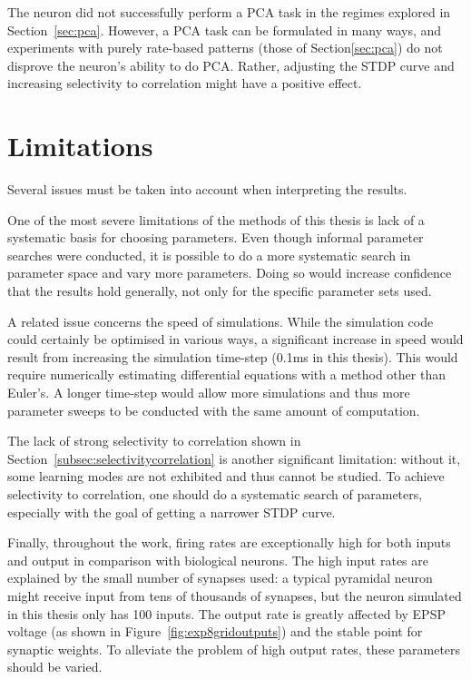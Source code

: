 \documentclass[a4paper,12pt]{report}
\theoremstyle{definition}
\begin{document}
The neuron did not successfully perform a PCA task in the regimes explored in Section~\ref{sec:pca}. However, a PCA task can be formulated in many ways, and experiments with purely rate-based patterns (those of Section\ref{sec:pca}) do not disprove the neuron's ability to do PCA. Rather, adjusting the STDP curve and increasing selectivity to correlation might have a positive effect.





\section{Limitations}

Several issues must be taken into account when interpreting the results.

One of the most severe limitations of the methods of this thesis is lack of a systematic basis for choosing parameters. Even though informal parameter searches were conducted, it is possible to do a more systematic search in parameter space and vary more parameters. Doing so would increase confidence that the results hold generally, not only for the specific parameter sets used.

A related issue concerns the speed of simulations. While the simulation code could certainly be optimised in various ways, a significant increase in speed would result from increasing the simulation time-step (0.1ms in this thesis). This would require numerically estimating differential equations with a method other than Euler's. A longer time-step would allow more simulations and thus more parameter sweeps to be conducted with the same amount of computation.

The lack of strong selectivity to correlation shown in Section~\ref{subsec:selectivitycorrelation} is another significant limitation: without it, some learning modes are not exhibited and thus cannot be studied. To achieve selectivity to correlation, one should do a systematic search of parameters, especially with the goal of getting a narrower STDP curve.

Finally, throughout the work, firing rates are exceptionally high for both inputs and output in comparison with biological neurons. The high input rates are explained by the small number of synapses used: a typical pyramidal neuron might receive input from tens of thousands of synapses, but the neuron simulated in this thesis only has 100 inputs. The output rate is greatly affected by EPSP voltage (as shown in Figure~\ref{fig:exp8gridoutputs}) and the stable point for synaptic weights. To alleviate the problem of high output rates, these parameters should be varied.
\end{document}
